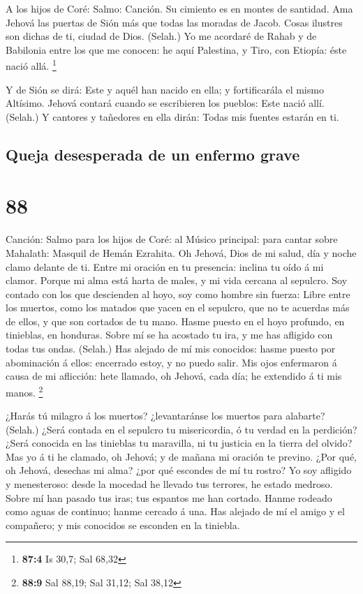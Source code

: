  A los hijos de Coré: Salmo: Canción. Su cimiento es en
montes de santidad.  Ama Jehová las puertas de Sión más que
todas las moradas de Jacob.  Cosas ilustres son dichas de
ti, ciudad de Dios. (Selah.)  Yo me acordaré de Rahab y de
Babilonia entre los que me conocen: he aquí Palestina, y Tiro, con
Etiopía: éste nació allá. \footnote{\textbf{87:4} Is 30,7; Sal 68,32}

 Y de Sión se dirá: Este y aquél han nacido en ella; y
fortificarála el mismo Altísimo.  Jehová contará cuando se
escribieren los pueblos: Este nació allí. (Selah.)  Y
cantores y tañedores en ella dirán: Todas mis fuentes estarán en ti.

\hypertarget{queja-desesperada-de-un-enfermo-grave}{%
\subsection{Queja desesperada de un enfermo
grave}\label{queja-desesperada-de-un-enfermo-grave}}

\hypertarget{section-87}{%
\section{88}\label{section-87}}

 Canción: Salmo para los hijos de Coré: al Músico principal:
para cantar sobre Mahalath: Masquil de Hemán Ezrahita. Oh Jehová, Dios
de mi salud, día y noche clamo delante de ti.  Entre mi
oración en tu presencia: inclina tu oído á mi clamor. 
Porque mi alma está harta de males, y mi vida cercana al sepulcro.
 Soy contado con los que descienden al hoyo, soy como hombre
sin fuerza:  Libre entre los muertos, como los matados que
yacen en el sepulcro, que no te acuerdas más de ellos, y que son
cortados de tu mano.  Hasme puesto en el hoyo profundo, en
tinieblas, en honduras.  Sobre mí se ha acostado tu ira, y
me has afligido con todas tus ondas. (Selah.)  Has alejado
de mí mis conocidos: hasme puesto por abominación á ellos: encerrado
estoy, y no puedo salir.  Mis ojos enfermaron á causa de mi
aflicción: hete llamado, oh Jehová, cada día; he extendido á ti mis
manos. \footnote{\textbf{88:9} Sal 88,19; Sal 31,12; Sal 38,12}

 ¿Harás tú milagro á los muertos? ¿levantaránse los muertos
para alabarte? (Selah.)  ¿Será contada en el sepulcro tu
misericordia, ó tu verdad en la perdición?  ¿Será conocida
en las tinieblas tu maravilla, ni tu justicia en la tierra del olvido?
 Mas yo á ti he clamado, oh Jehová; y de mañana mi oración
te previno.  ¿Por qué, oh Jehová, desechas mi alma? ¿por
qué escondes de mí tu rostro?  Yo soy afligido y
menesteroso: desde la mocedad he llevado tus terrores, he estado
medroso.  Sobre mí han pasado tus iras; tus espantos me han
cortado.  Hanme rodeado como aguas de continuo; hanme
cercado á una.  Has alejado de mí el amigo y el compañero;
y mis conocidos se esconden en la tiniebla.

